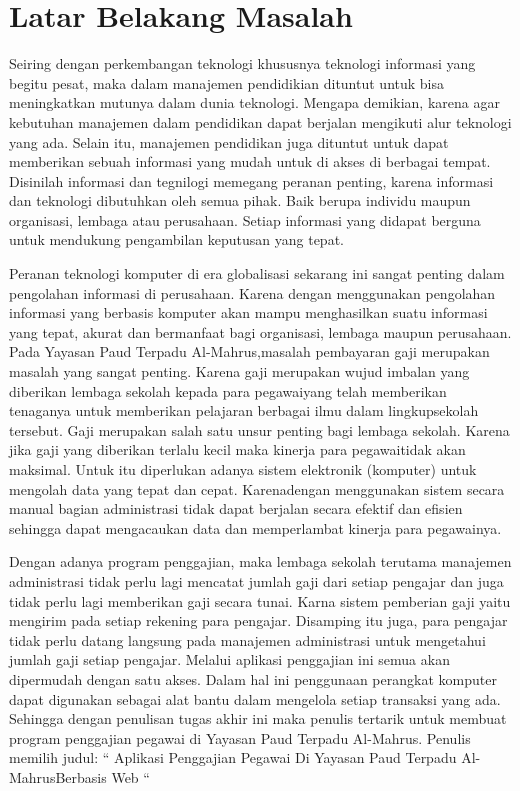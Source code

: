 \documentclass{jtetiproposalskripsi}
\begin{document}
\section{Latar Belakang Masalah}
Seiring dengan perkembangan teknologi khususnya teknologi informasi yang begitu pesat, maka dalam manajemen pendidikian dituntut untuk bisa meningkatkan mutunya dalam dunia teknologi. Mengapa demikian, karena agar kebutuhan manajemen dalam pendidikan dapat berjalan mengikuti alur teknologi yang ada. Selain itu, manajemen pendidikan juga dituntut untuk dapat memberikan sebuah informasi yang mudah untuk di akses di berbagai tempat. Disinilah informasi dan tegnilogi memegang peranan penting, karena informasi dan teknologi dibutuhkan oleh semua pihak. Baik berupa individu maupun organisasi, lembaga atau perusahaan. Setiap informasi yang didapat berguna untuk mendukung pengambilan keputusan yang tepat. 

Peranan teknologi komputer di era globalisasi sekarang ini sangat penting dalam pengolahan informasi di perusahaan. Karena dengan menggunakan pengolahan informasi yang berbasis komputer akan mampu menghasilkan suatu informasi yang tepat, akurat dan bermanfaat bagi organisasi, lembaga maupun perusahaan. Pada Yayasan Paud Terpadu Al-Mahrus,masalah pembayaran gaji merupakan masalah yang sangat penting. Karena gaji merupakan wujud imbalan yang diberikan lembaga sekolah kepada para pegawaiyang telah memberikan tenaganya untuk memberikan pelajaran berbagai ilmu dalam lingkupsekolah tersebut. Gaji merupakan salah satu unsur penting bagi lembaga sekolah. Karena jika gaji yang diberikan terlalu kecil maka kinerja para pegawaitidak akan maksimal. Untuk itu diperlukan adanya sistem elektronik (komputer) untuk mengolah data yang tepat dan cepat. Karenadengan menggunakan sistem secara manual bagian administrasi tidak dapat berjalan secara efektif dan efisien sehingga dapat mengacaukan data dan memperlambat kinerja para pegawainya. 

Dengan adanya program penggajian, maka lembaga sekolah terutama manajemen administrasi tidak perlu lagi mencatat jumlah gaji dari setiap pengajar dan juga tidak perlu lagi memberikan gaji secara tunai. Karna sistem pemberian gaji yaitu mengirim pada setiap rekening para pengajar. Disamping itu juga, para pengajar tidak perlu datang langsung pada manajemen administrasi untuk mengetahui jumlah gaji setiap pengajar. Melalui aplikasi penggajian ini semua akan dipermudah dengan satu akses.
Dalam hal ini penggunaan perangkat komputer dapat digunakan sebagai alat bantu dalam mengelola setiap transaksi yang ada. Sehingga dengan penulisan tugas akhir ini maka penulis tertarik untuk membuat program penggajian pegawai di Yayasan Paud Terpadu Al-Mahrus. Penulis memilih judul: “ Aplikasi Penggajian Pegawai Di Yayasan Paud Terpadu Al-MahrusBerbasis Web “
\end{document}
